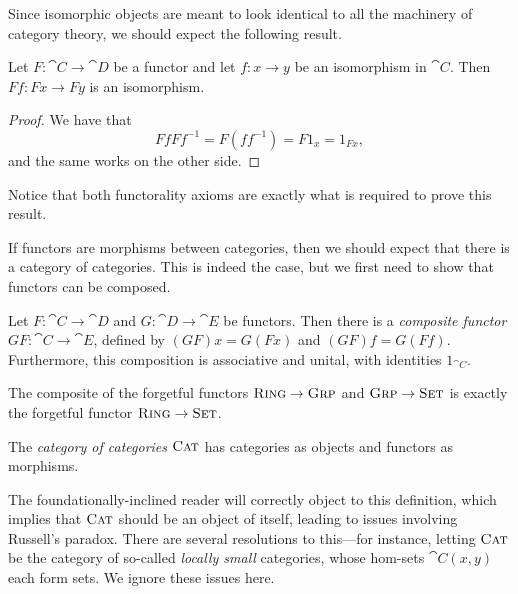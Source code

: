 Since isomorphic objects are meant to look identical to all the machinery of
category theory, we should expect the following result.

\begin{prop}
  Let $F: \cat{C}\to\cat{D}$ be a functor and let $f: x\to y$ be an isomorphism
  in $\cat{C}$. Then $Ff: Fx\to Fy$ is an isomorphism.
\end{prop}

\begin{proof}
  We have that \[
    FfFf^{-1} = F(ff^{-1}) = F1_x = 1_{Fx},
  \]and the same works on the other side.
\end{proof}

Notice that both functorality axioms are exactly what is required to prove this
result.

\vspace{1em}

If functors are morphisms between categories, then we should expect that there
is a category of categories. This is indeed the case, but we first need to show
that functors can be composed.

\begin{prop}
  Let $F: \cat{C}\to\cat{D}$ and $G: \cat{D}\to\cat{E}$ be functors. Then there
  is a \emph{composite functor} $GF: \cat{C}\to\cat{E}$, defined by $(GF)x =
  G(Fx)$ and $(GF)f = G(Ff)$. Furthermore, this composition is associative and
  unital, with identities $1_{\cat{C}}$.
\end{prop}

\begin{ex}
  The composite of the forgetful functors ${\textsc{\text{Ring}}}\to{\textsc{\text{Grp}}}$ and
  ${\textsc{\text{Grp}}}\to{\textsc{\text{Set}}}$ is exactly the forgetful functor
  ${\textsc{\text{Ring}}}\to{\textsc{\text{Set}}}$.
\end{ex}

\begin{dfn}
  The \emph{category of categories} ${\textsc{\text{Cat}}}$ has categories as objects and
  functors as morphisms.
\end{dfn}

The foundationally-inclined reader will correctly object to this definition,
which implies that ${\textsc{\text{Cat}}}$ should be an object of itself, leading to issues
involving Russell's paradox. There are several resolutions to this---for
instance, letting ${\textsc{\text{Cat}}}$ be the category of so-called \emph{locally small}
categories, whose hom-sets $\cat{C}(x, y)$ each form sets. We ignore these
issues here.


